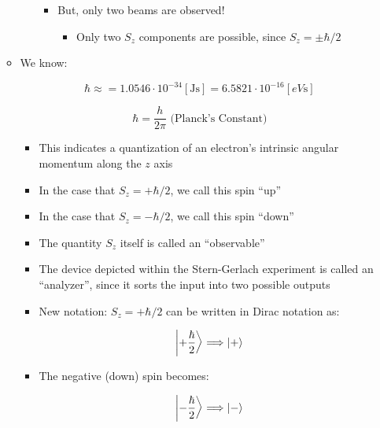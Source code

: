 \begin{itemize}
\begin{itemize}
\begin{itemize}
            \begin{itemize}

              \item But, only two beams are observed!

                \begin{itemize}

                  \item Only two $S_z$ components are possible, since $S_z=\pm \hbar/2$

                \end{itemize}

            \end{itemize}

        \end{itemize}

      \item We know:

        $$\hbar\approx=1.0546\cdot10^{-34}[\si{\joule\second}]=6.5821\cdot10^{-16}[\si{eV\second}]$$

        $$\hbar=\frac{h}{2\pi}\text{ (Planck's Constant)}$$

        \begin{itemize}

          \item This indicates a quantization of an electron's intrinsic angular momentum along the $z$ axis

          \item In the case that $S_z=+\hbar/2$, we call this spin ``up''

          \item In the case that $S_z=-\hbar/2$, we call this spin ``down''

          \item The quantity $S_z$ itself is called an ``observable''

          \item The device depicted within the Stern-Gerlach experiment is called an ``analyzer'', since it sorts the input into two possible outputs

          \item New notation: $S_z=+\hbar/2$ can be written in Dirac notation as:

            $$\ket{+\frac{\hbar}{2}}\Longrightarrow \ket{+}$$

          \item The negative (down) spin becomes:

            $$\ket{-\frac{\hbar}{2}}\Longrightarrow \ket{-}$$


\end{itemize}
\end{itemize}
\end{itemize}
